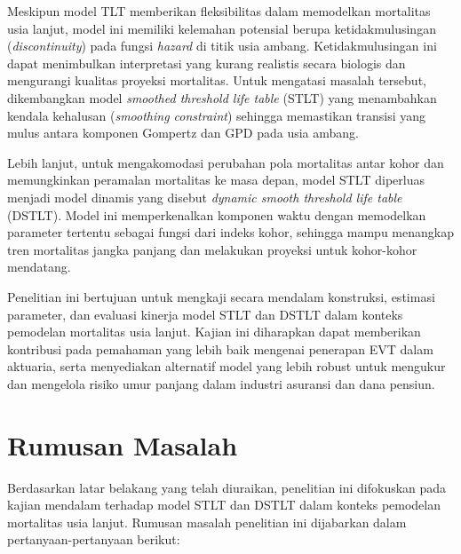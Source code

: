Meskipun model TLT memberikan fleksibilitas dalam memodelkan mortalitas usia lanjut, model ini memiliki kelemahan potensial berupa ketidakmulusingan (\textit{discontinuity}) pada fungsi \textit{hazard} di titik usia ambang. Ketidakmulusingan ini dapat menimbulkan interpretasi yang kurang realistis secara biologis dan mengurangi kualitas proyeksi mortalitas. Untuk mengatasi masalah tersebut, dikembangkan model \textit{smoothed threshold life table} (STLT) yang menambahkan kendala kehalusan (\textit{smoothing constraint}) sehingga memastikan transisi yang mulus antara komponen Gompertz dan GPD pada usia ambang.

Lebih lanjut, untuk mengakomodasi perubahan pola mortalitas antar kohor dan memungkinkan peramalan mortalitas ke masa depan, model STLT diperluas menjadi model dinamis yang disebut \textit{dynamic smooth threshold life table} (DSTLT). Model ini memperkenalkan komponen waktu dengan memodelkan parameter tertentu sebagai fungsi dari indeks kohor, sehingga mampu menangkap tren mortalitas jangka panjang dan melakukan proyeksi untuk kohor-kohor mendatang.

Penelitian ini bertujuan untuk mengkaji secara mendalam konstruksi, estimasi parameter, dan evaluasi kinerja model STLT dan DSTLT dalam konteks pemodelan mortalitas usia lanjut. Kajian ini diharapkan dapat memberikan kontribusi pada pemahaman yang lebih baik mengenai penerapan EVT dalam aktuaria, serta menyediakan alternatif model yang lebih robust untuk mengukur dan mengelola risiko umur panjang dalam industri asuransi dan dana pensiun.

\section{Rumusan Masalah}

Berdasarkan latar belakang yang telah diuraikan, penelitian ini difokuskan pada kajian mendalam terhadap model STLT dan DSTLT dalam konteks pemodelan mortalitas usia lanjut. Rumusan masalah penelitian ini dijabarkan dalam pertanyaan-pertanyaan berikut:

